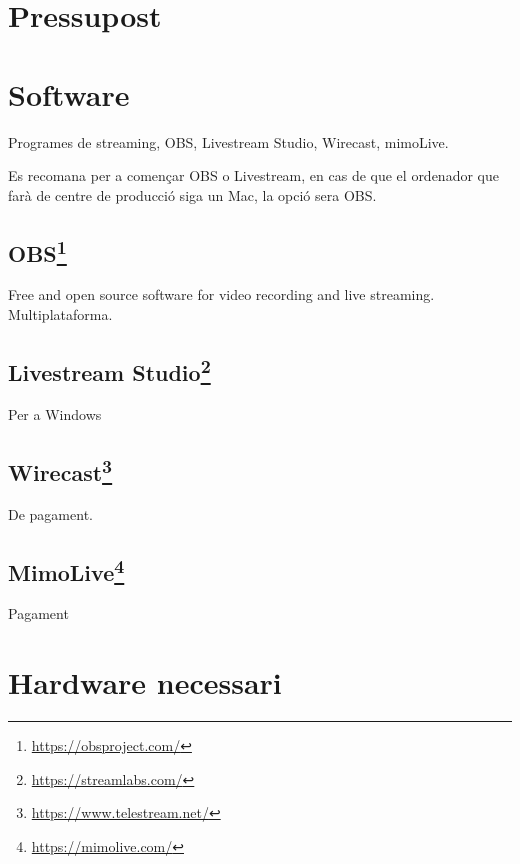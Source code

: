 \documentclass[
  10pt,
]{book}
\DeclareRobustCommand{\href}[2]{#2\footnote{\url{#1}}}
\begin{document}
\hypertarget{pressupost}{%
\section{Pressupost}\label{pressupost}}

\hypertarget{software}{%
\section{Software}\label{software}}

Programes de streaming, OBS, Livestream Studio, Wirecast, mimoLive.

Es recomana per a començar OBS o Livestream, en cas de que el ordenador que farà de centre de producció siga un Mac, la opció sera OBS.

\hypertarget{obs}{%
\subsection{\texorpdfstring{\href{https://obsproject.com/}{OBS}}{OBS}}\label{obs}}

Free and open source software for video recording and live streaming. Multiplataforma.

\hypertarget{livestream-studio}{%
\subsection{\texorpdfstring{\href{https://streamlabs.com/}{Livestream Studio}}{Livestream Studio}}\label{livestream-studio}}

Per a Windows

\hypertarget{wirecast}{%
\subsection{\texorpdfstring{\href{https://www.telestream.net/}{Wirecast}}{Wirecast}}\label{wirecast}}

De pagament.

\hypertarget{mimolive}{%
\subsection{\texorpdfstring{\href{https://mimolive.com/}{MimoLive}}{MimoLive}}\label{mimolive}}

Pagament

\hypertarget{hardware-necessari}{%
\section{Hardware necessari}\label{hardware-necessari}}
\end{document}
